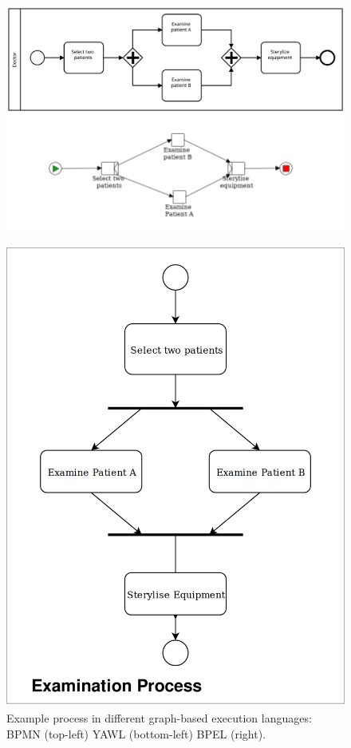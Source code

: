 \begin{figure}[htb]
  \begin{minipage}{.65\textwidth}
    \centering
    \includegraphics[width=\textwidth]{figures/bpn_comparison/bpmn}
    \includegraphics[width=\textwidth]{figures/bpn_comparison/yawl}
  \end{minipage}
  \hfill
  \begin{minipage}{.34\textwidth}
    \centering
    \includegraphics[width=\textwidth]{figures/bpn_comparison/BPEL}
  \end{minipage}
  \caption{Example process in different graph-based execution languages: BPMN (top-left)
     YAWL (bottom-left) BPEL (right).}
  \label{fig:bpn_comparison_graph}
\end{figure}

